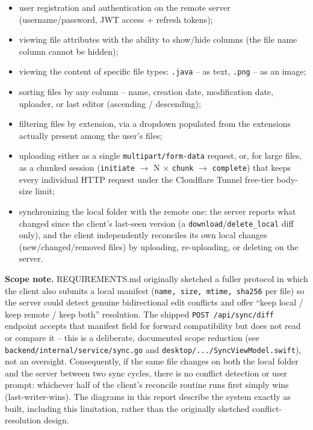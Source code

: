 \documentclass[12pt,a4paper]{article}
\begin{document}
\begin{itemize}[nosep]
    \item user registration and authentication on the remote server (username/password, JWT access + refresh tokens);
    \item viewing file attributes with the ability to show/hide columns (the file name column cannot be hidden);
    \item viewing the content of specific file types: \texttt{.java} -- as text, \texttt{.png} -- as an image;
    \item sorting files by any column -- name, creation date, modification date, uploader, or last editor (ascending / descending);
    \item filtering files by extension, via a dropdown populated from the extensions actually present among the user's files;
    \item uploading either as a single \texttt{multipart/form-data} request, or, for large files, as a chunked session (\texttt{initiate} $\to$ N $\times$ \texttt{chunk} $\to$ \texttt{complete}) that keeps every individual HTTP request under the Cloudflare Tunnel free-tier body-size limit;
    \item synchronizing the local folder with the remote one: the server reports what changed since the client's last-seen version (a \texttt{download}/\texttt{delete\_local} diff only), and the client independently reconciles its own local changes (new/changed/removed files) by uploading, re-uploading, or deleting on the server.
\end{itemize}

\textbf{Scope note.} REQUIREMENTS.md originally sketched a fuller protocol in which the client also submits a local manifest (\texttt{name, size, mtime, sha256} per file) so the server could detect genuine bidirectional edit conflicts and offer ``keep local / keep remote / keep both'' resolution. The shipped \texttt{POST /api/sync/diff} endpoint accepts that manifest field for forward compatibility but does not read or compare it -- this is a deliberate, documented scope reduction (see \texttt{backend/internal/service/sync.go} and \texttt{desktop/.../SyncViewModel.swift}), not an oversight. Consequently, if the same file changes on both the local folder and the server between two sync cycles, there is no conflict detection or user prompt: whichever half of the client's reconcile routine runs first simply wins (last-writer-wins). The diagrams in this report describe the system exactly as built, including this limitation, rather than the originally sketched conflict-resolution design.
\end{document}
